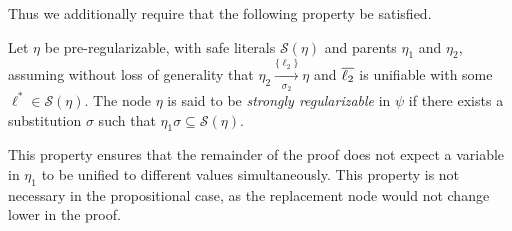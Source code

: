 \noindent
Thus we additionally require that the following property be satisfied.
\begin{definition}
\label{prop:extracheck}
Let $\eta$ be pre-regularizable, with safe literals $\mathcal{S}(\eta)$ and parents $\eta_1$ and $\eta_2$, assuming without loss of generality that
$\eta_2 \xrightarrow[\sigma_2]{\{\ell_2\} } \eta$ and $\overline{\ell_2}$ is unifiable with some $\ell^* \in \mathcal{S}(\eta)$. 
The node $\eta$ is said to be \emph{strongly regularizable} in $\psi$ if there exists a substitution $\sigma$ such that $\eta_1\sigma \subseteq \mathcal{S}(\eta)$.
\end{definition}
This property ensures that the remainder of the proof does not expect a variable in $\eta_1$ to be unified to different values simultaneously. This property is not necessary in the propositional case, as the replacement node would not change lower in the proof. 





